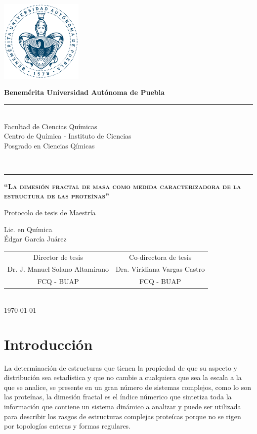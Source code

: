 \documentclass[11pt]{article}
\newcommand\vtab[1][0.5cm]{\vspace*{#1}}
\begin{document}
\pagestyle{empty} 
\phantom{a}
\vspace{-1.4cm}
\begin{center}
\includegraphics[width=4cm]{buap.pdf}

\Large{\textbf{Benemérita Universidad Autónoma de Puebla}\\
\rule{150mm}{0.1mm}\\
Facultad de Ciencias Químicas\\
Centro de Química - Instituto de Ciencias\\
Posgrado en Ciencias Qímicas}\\
\rule{150mm}{0.1mm}

\vtab[.1cm]
{\scshape\large \textbf{``La dimesión fractal  de masa como medida caracterizadora de la estructura de las proteínas''} \par}
\vtab[.1cm]
\Large{Protocolo de tesis de Maestría}\\
\vtab[0.2cm]

Lic. en Química \\
Édgar García Juárez \\
\vtab[0.5cm]
\begin{tabular}{cc}
\vtab[10mm]
Director de tesis & Co-directora de tesis \\
Dr. J. Manuel Solano Altamirano & Dra. Viridiana Vargas Castro \\ 
FCQ - BUAP & FCQ - BUAP \\ 
\end{tabular} 
\vtab[1cm] \\
{\today}
\end{center}

\clearpage

\section{Introducción}

La determinación de estructuras que tienen la propiedad de que su aspecto y distribución sea estadística y que no cambie a cualquiera que sea la escala a la que se analice, se presente en un gran número de sistemas complejos, como lo son las proteínas, la dimesión fractal es el índice númerico que sintetiza toda la información que contiene un sistema dinámico a analizar y puede ser utilizada para describir los rasgos de estructuras  complejas proteícas porque no se rigen por topologías enteras y formas regulares. 
\end{document}
